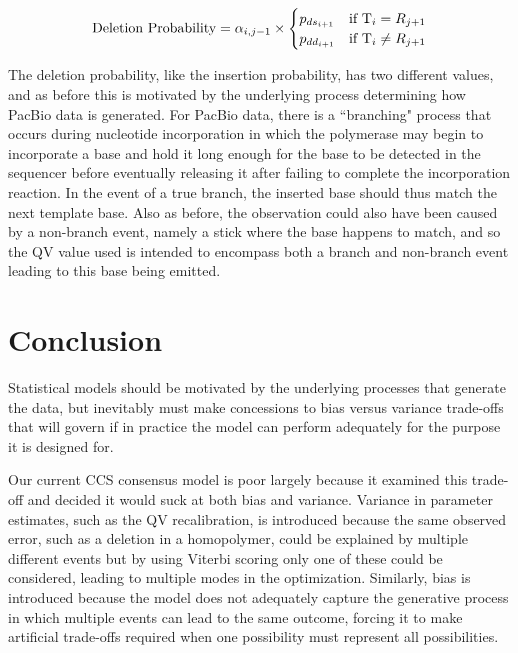 \documentclass[fleqn,10pt]{SelfArx} %
\begin{document}
\begin{dmath}
	\text{Deletion Probability} = \alpha_{i,j-1}  \\
	\times  \begin{cases}
				p_{ds_{i+1}}  & \text{if }  \text{T}_{i} = R_{j+1} \\
				p_{dd_{i+1}} & \text{if }  \text{T}_{i} \neq R_{j+1} 
				\end{cases}
\end{dmath}



The deletion probability, like the insertion probability, has two different values, and as before this is motivated by the underlying process determining how PacBio data is generated.  For PacBio data, there is a ``branching" process that occurs during nucleotide incorporation in which the polymerase may begin to incorporate a base and hold it long enough for the base to be detected in the sequencer before eventually releasing it after failing to complete the incorporation reaction.  In the event of a true branch, the inserted base should thus match the next template base.  Also as before, the observation could also have been caused by a non-branch event, namely a stick where the base happens to match, and so the QV value used is intended to encompass both a branch and non-branch event leading to this base being emitted.





\section{Conclusion}

Statistical models should be motivated by the underlying processes that generate the data, but inevitably must make concessions to bias versus variance trade-offs that will govern if in practice the model can perform adequately for the purpose it is designed for.

Our current CCS consensus model is poor largely because it examined this trade-off and decided it would suck at both bias and variance.  Variance in parameter estimates, such as the QV recalibration, is introduced because the same observed error, such as a deletion in a homopolymer, could be explained by multiple different events but by using Viterbi scoring only one of these could be considered, leading to multiple modes in the optimization.  Similarly, bias is introduced because the model does not adequately capture the generative process in which multiple events can lead to the same outcome, forcing it to make artificial trade-offs required when one possibility must represent all possibilities.
\end{document}

